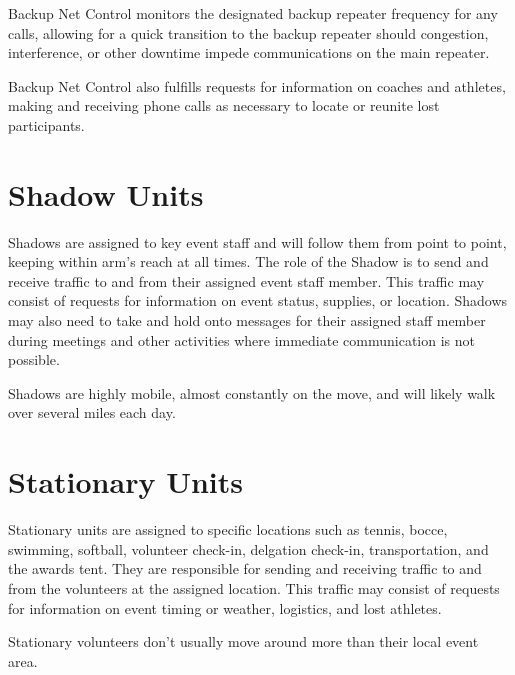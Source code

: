 \documentclass[pdflatex,letterpaper,twoside,12pt]{book}
\begin{document}
Backup Net Control monitors the designated backup repeater frequency for any calls, allowing for a quick transition to the backup repeater should congestion, interference, or other downtime impede communications on the main repeater.

Backup Net Control also fulfills requests for information on coaches and athletes, making and receiving phone calls as necessary to locate or reunite lost participants.


\section{Shadow Units}

Shadows are assigned to key event staff and will follow them from point to point, keeping within arm's reach at all times.  The role of the Shadow is to send and receive traffic to and from their assigned event staff member.  This traffic may consist of requests for information on event status, supplies, or location.  Shadows may also need to take and hold onto messages for their assigned staff member during meetings and other activities where immediate communication is not possible.

Shadows are highly mobile, almost constantly on the move, and will likely walk over several miles each day.


\section{Stationary Units}

Stationary units are assigned to specific locations such as tennis, bocce, swimming, softball, volunteer check-in, delgation check-in, transportation, and the awards tent.  They are responsible for sending and receiving traffic to and from the volunteers at the assigned location.  This traffic may consist of requests for information on event timing or weather, logistics, and lost athletes. 

Stationary volunteers don't usually move around more than their local event area. 

\end{document}
